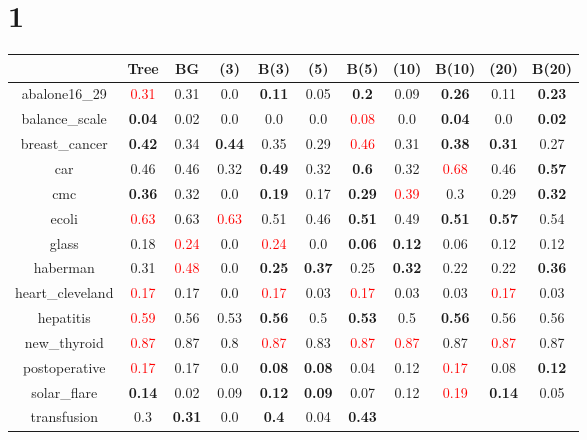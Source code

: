 \documentclass{article}%
\begin{document}
\section*{1}%
\begin{tabular}{c|cccccccccc}%
\hline%
&Tree&BG&(3)&B(3)&(5)&B(5)&(10)&B(10)&(20)&B(20)\\%
\hline%
abalone16\_29&\textcolor{red}{ 
0.31
}&0.31&0.0&\textbf{0.11}&0.05&\textbf{0.2}&0.09&\textbf{0.26}&0.11&\textbf{0.23}\\%
\hline%
balance\_scale&\textbf{0.04}&0.02&0.0&0.0&0.0&\textcolor{red}{ 
0.08
}&0.0&\textbf{0.04}&0.0&\textbf{0.02}\\%
\hline%
breast\_cancer&\textbf{0.42}&0.34&\textbf{0.44}&0.35&0.29&\textcolor{red}{ 
0.46
}&0.31&\textbf{0.38}&\textbf{0.31}&0.27\\%
\hline%
car&0.46&0.46&0.32&\textbf{0.49}&0.32&\textbf{0.6}&0.32&\textcolor{red}{ 
0.68
}&0.46&\textbf{0.57}\\%
\hline%
cmc&\textbf{0.36}&0.32&0.0&\textbf{0.19}&0.17&\textbf{0.29}&\textcolor{red}{ 
0.39
}&0.3&0.29&\textbf{0.32}\\%
\hline%
ecoli&\textcolor{red}{ 
0.63
}&0.63&\textcolor{red}{ 
0.63
}&0.51&0.46&\textbf{0.51}&0.49&\textbf{0.51}&\textbf{0.57}&0.54\\%
\hline%
glass&0.18&\textcolor{red}{ 
0.24
}&0.0&\textcolor{red}{ 
0.24
}&0.0&\textbf{0.06}&\textbf{0.12}&0.06&0.12&0.12\\%
\hline%
haberman&0.31&\textcolor{red}{ 
0.48
}&0.0&\textbf{0.25}&\textbf{0.37}&0.25&\textbf{0.32}&0.22&0.22&\textbf{0.36}\\%
\hline%
heart\_cleveland&\textcolor{red}{ 
0.17
}&0.17&0.0&\textcolor{red}{ 
0.17
}&0.03&\textcolor{red}{ 
0.17
}&0.03&0.03&\textcolor{red}{ 
0.17
}&0.03\\%
\hline%
hepatitis&\textcolor{red}{ 
0.59
}&0.56&0.53&\textbf{0.56}&0.5&\textbf{0.53}&0.5&\textbf{0.56}&0.56&0.56\\%
\hline%
new\_thyroid&\textcolor{red}{ 
0.87
}&0.87&0.8&\textcolor{red}{ 
0.87
}&0.83&\textcolor{red}{ 
0.87
}&\textcolor{red}{ 
0.87
}&0.87&\textcolor{red}{ 
0.87
}&0.87\\%
\hline%
postoperative&\textcolor{red}{ 
0.17
}&0.17&0.0&\textbf{0.08}&\textbf{0.08}&0.04&0.12&\textcolor{red}{ 
0.17
}&0.08&\textbf{0.12}\\%
\hline%
solar\_flare&\textbf{0.14}&0.02&0.09&\textbf{0.12}&\textbf{0.09}&0.07&0.12&\textcolor{red}{ 
0.19
}&\textbf{0.14}&0.05\\%
\hline%
transfusion&0.3&\textbf{0.31}&0.0&\textbf{0.4}&0.04&\textbf{0.43}&\textcolor{red}{ 
}
\end{tabular}
\end{document}
